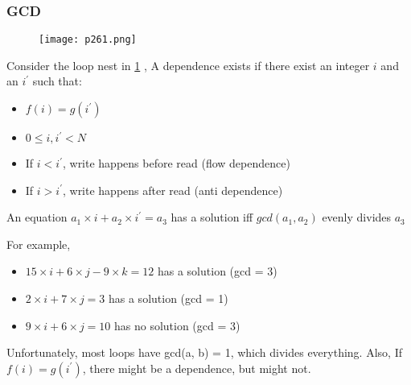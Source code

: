 \subsubsection{GCD}



\begin{figure}[H]
    \centering
    \texttt{[image: p261.png]}
    \caption{}
    \label{fig:p261}
\end{figure}

Consider the loop nest in \ref{fig:p261} , A dependence exists if there exist an integer $i$ and an $i^\prime$ such
that:
\begin{itemize}
    \item  $f(i) = g(i^\prime)$
    \item  $0 \leq i, i^\prime < N$
    \item  If $i < i^\prime$, write happens before read (flow dependence)
    \item  If $i > i^\prime$, write happens after read (anti dependence)
\end{itemize}




An equation $a_1 \times i + a_2 \times i^\prime = a_3$ has a solution iff $gcd(a_1, a_2)$
evenly divides $a_3$

For example,
\begin{itemize}
    \item $15 \times i + 6 \times j - 9 \times k = 12$ has a solution (gcd = 3)
    \item $2 \times i + 7 \times j = 3$ has a solution (gcd = 1)
    \item $9 \times i + 6 \times j = 10$ has no solution (gcd = 3)
\end{itemize}



Unfortunately, most loops have gcd(a, b) = 1, which divides
everything. Also, If $f(i) = g(i^\prime)$, there might be a dependence, 
but might not.
